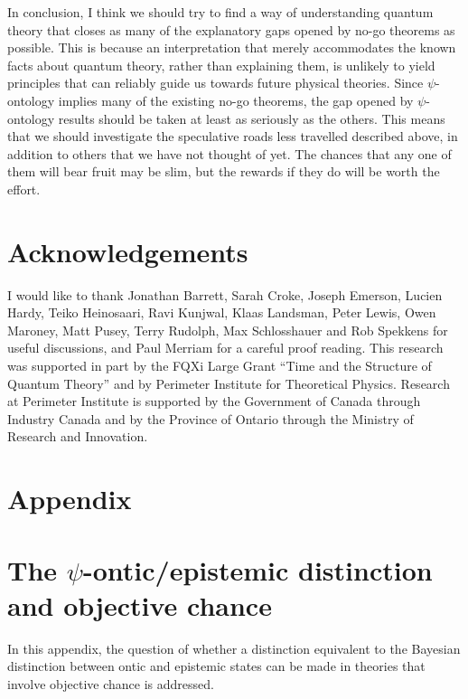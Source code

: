 \documentclass[DIV=calc,fontsize=12pt]{scrartcl} %
\theoremstyle{definition}
\theoremstyle{plain}
\begin{document}
In conclusion, I think we should try to find a way of understanding
quantum theory that closes as many of the explanatory gaps opened by
no-go theorems as possible.  This is because an interpretation that
merely accommodates the known facts about quantum theory, rather than
explaining them, is unlikely to yield principles that can reliably
guide us towards future physical theories.  Since $\psi$-ontology
implies many of the existing no-go theorems, the gap opened by
$\psi$-ontology results should be taken at least as seriously as the
others.  This means that we should investigate the speculative roads
less travelled described above, in addition to others that we have not
thought of yet.  The chances that any one of them will bear fruit may
be slim, but the rewards if they do will be worth the effort.

\section*{Acknowledgements}

I would like to thank Jonathan Barrett, Sarah Croke, Joseph Emerson,
Lucien Hardy, Teiko Heinosaari, Ravi Kunjwal, Klaas Landsman, Peter
Lewis, Owen Maroney, Matt Pusey, Terry Rudolph, Max Schlosshauer and
Rob Spekkens for useful discussions, and Paul Merriam for a careful
proof reading.  This research was supported in part by the FQXi Large
Grant ``Time and the Structure of Quantum Theory'' and by Perimeter
Institute for Theoretical Physics.  Research at Perimeter Institute is
supported by the Government of Canada through Industry Canada and by
the Province of Ontario through the Ministry of Research and
Innovation.

\section*{Appendix}
\appendix

\section{The $\psi$-ontic/epistemic distinction and objective chance}

\label{App:Chance}

In this appendix, the question of whether a distinction equivalent to
the Bayesian distinction between ontic and epistemic states can be
made in theories that involve objective chance is addressed.
\end{document}

